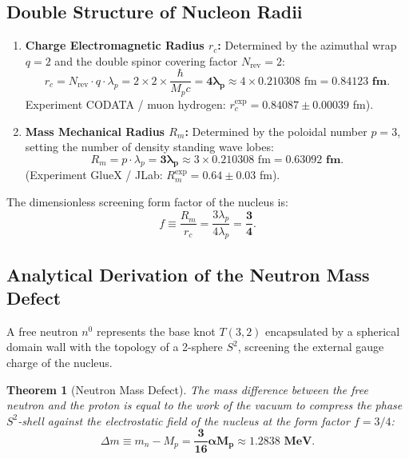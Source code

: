 \documentclass[12pt,a4paper]{article}
\newtheorem{theorem}{Theorem}
\begin{document}
	\subsection{Double Structure of Nucleon Radii}
	\begin{enumerate}
	\item \textbf{Charge Electromagnetic Radius $r_c$:} Determined by the azimuthal wrap $q=2$ and the double spinor covering factor $N_{\text{rev}} = 2$:
	\begin{equation}
	r_c = N_{\text{rev}} \cdot q \cdot \lambda_p = 2 \times 2 \times \frac{\hbar}{M_p c} = \mathbf{4 \lambda_p} \approx 4 \times 0.210308 \text{ fm} = \mathbf{0.84123 \text{ fm}}.
	\end{equation}
	Experiment CODATA / muon hydrogen: $r_c^{\text{exp}} = 0.84087 \pm 0.00039$ fm).
						
	\item \textbf{Mass Mechanical Radius $R_m$:} Determined by the poloidal number $p=3$, setting the number of density standing wave lobes:
	\begin{equation}
	R_m = p \cdot \lambda_p = \mathbf{3 \lambda_p} \approx 3 \times 0.210308 \text{ fm} = \mathbf{0.63092 \text{ fm}}.
	\end{equation}
	(Experiment GlueX / JLab: $R_m^{\text{exp}} = 0.64 \pm 0.03$ fm).
	\end{enumerate}
	The dimensionless screening form factor of the nucleus is:
	\begin{equation}
	f \equiv \frac{R_m}{r_c} = \frac{3 \lambda_p}{4 \lambda_p} = \mathbf{\frac{3}{4}}.
	\end{equation}
						
	\subsection{Analytical Derivation of the Neutron Mass Defect}
	A free neutron $n^0$ represents the base knot $T(3,2)$ encapsulated by a spherical domain wall with the topology of a 2-sphere $S^2$, screening the external gauge charge of the nucleus.
						
	\begin{theorem}[Neutron Mass Defect]
	The mass difference between the free neutron and the proton is equal to the work of the vacuum to compress the phase $S^2$-shell against the electrostatic field of the nucleus at the form factor $f = 3/4$:
	\begin{equation}
	\Delta m \equiv m_n - M_p = \mathbf{\frac{3}{16} \alpha M_p} \approx \mathbf{1.2838 \text{ MeV}}.
	\end{equation}
	\end{theorem}
							
\end{document}
